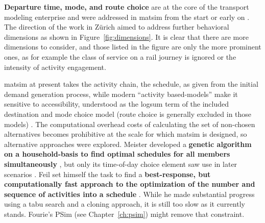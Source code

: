 \textbf{Departure time, mode, and route choice} are at the core of the transport modeling enterprise and were addressed in \gls{matsim} from the start \citep{RaneyNagel2004agdb} or early on \citep{BalmerRaneyEtAl2005act-times,RieserGretherNagel2008modeChoiceCalculations}.
%
The direction of the work in Zürich aimed to address further behavioral dimensions 
as shown in Figure~\ref{fig:dimensions}.
It is clear that there are more dimensions to consider, and those listed in the figure are only the more prominent ones, as for example the class of service on a rail journey is ignored or the intensity of activity engagement. 

\gls{matsim} at present takes the activity chain, the schedule, as given from the initial demand generation process, while modern ``activity based-models'' make it sensitive to accessibility, understood as the logsum term of the included destination and mode choice model (route choice is generally excluded in those models) \citep[see][for an early example]{BenAkivaEtAl_Transportation_1996}.
The computational overhead costs of calculating the set of non-chosen alternatives becomes prohibitive at the scale for which \gls{matsim} is designed,
 so alternative approaches were explored. 
%
Meister developed a \textbf{genetic algorithm on a household-basis to find optimal schedules for all members simultaneously} \citep[reported in][]{MeisterEtAl_Transportation_2005},
but only its time-of-day choice element saw use in later scenarios \citep{MeisterEtAl_IATBR_2006}.
%
Feil set himself the task to find a \textbf{best-response, but computationally fast approach to the optimization of the number and sequence of activities into a schedule} \citep[][]{Feil_PhDThesis_2010}. While he made substantial progress using a tabu search and a cloning approach, it is still too slow as it currently stands. Fourie's PSim (see Chapter~\ref{ch:psim}) might remove that constraint.

